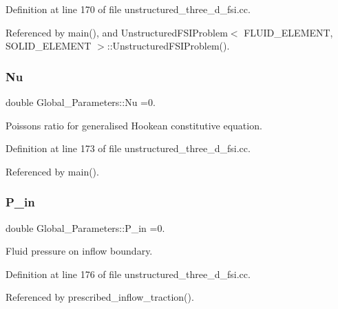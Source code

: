 Definition at line 170 of file unstructured\+\_\+three\+\_\+d\+\_\+fsi.\+cc.



Referenced by main(), and Unstructured\+F\+S\+I\+Problem$<$ F\+L\+U\+I\+D\+\_\+\+E\+L\+E\+M\+E\+N\+T, S\+O\+L\+I\+D\+\_\+\+E\+L\+E\+M\+E\+N\+T $>$\+::\+Unstructured\+F\+S\+I\+Problem().

\mbox{\label{namespaceGlobal__Parameters_a20fccdcfa2c15ad8b951b9ada3bb1661}} 
\subsubsection{\texorpdfstring{Nu}{Nu}}
{\footnotesize\ttfamily double Global\+\_\+\+Parameters\+::\+Nu =0.}



Poisson\textquotesingle{}s ratio for generalised Hookean constitutive equation. 



Definition at line 173 of file unstructured\+\_\+three\+\_\+d\+\_\+fsi.\+cc.



Referenced by main().

\mbox{\label{namespaceGlobal__Parameters_a05b26d00935600b5e0149872844f224c}} 
\subsubsection{\texorpdfstring{P\+\_\+in}{P\_in}}
{\footnotesize\ttfamily double Global\+\_\+\+Parameters\+::\+P\+\_\+in =0.}



Fluid pressure on inflow boundary. 



Definition at line 176 of file unstructured\+\_\+three\+\_\+d\+\_\+fsi.\+cc.



Referenced by prescribed\+\_\+inflow\+\_\+traction().

\mbox{\label{namespaceGlobal__Parameters_ac680ed856897793d54c9c867da19169c}} 
